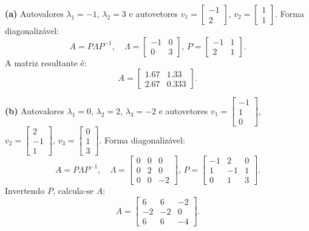 \begin{resolution}

  {\bf (a)} Autovalores \( \lambda_1 = -1 \), \( \lambda_2 = 3 \) e autovetores \( v_1 = \begin{bmatrix} -1 \\ 2 \end{bmatrix} \), \( v_2 = \begin{bmatrix} 1 \\ 1 \end{bmatrix} \).
  Forma diagonalizável:
  \[
    A = P \Lambda P^{-1}, \quad \Lambda = \begin{bmatrix} -1 & 0 \\ 0 & 3 \end{bmatrix}, \, P = \begin{bmatrix} -1 & 1 \\ 2 & 1 \end{bmatrix}.
  \]
  A matriz resultante é:
  \[
    A = \begin{bmatrix} 1.67 & 1.33 \\ 2.67 & 0.333 \end{bmatrix}.
  \]

  {\bf (b)} Autovalores \( \lambda_1 = 0 \), \( \lambda_2 = 2 \), \( \lambda_3 = -2 \) e autovetores \( v_1 = \begin{bmatrix} -1 \\ 1 \\ 0 \end{bmatrix} \), \( v_2 = \begin{bmatrix} 2 \\ -1 \\ 1 \end{bmatrix} \), \( v_3 = \begin{bmatrix} 0 \\ 1 \\ 3 \end{bmatrix} \).
  Forma diagonalizável:
  \[
    A = P \Lambda P^{-1}, \quad \Lambda = \begin{bmatrix} 0 & 0 & 0 \\ 0 & 2 & 0 \\ 0 & 0 & -2 \end{bmatrix}, \, P = \begin{bmatrix} -1 & 2 & 0 \\ 1 & -1 & 1 \\ 0 & 1 & 3 \end{bmatrix}.
  \]
  Invertendo \( P \), calcula-se \( A \):
  \[
    A = \begin{bmatrix} 6 & 6 & -2 \\ -2 & -2 & 0 \\ 6 & 6 & -4 \end{bmatrix}.
  \]


\end{resolution}
